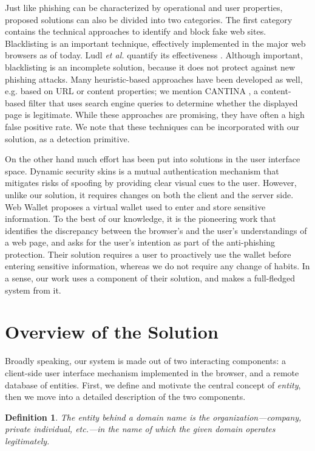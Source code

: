 \documentclass[11pt,styles/chicago,a4paper]{article}
\begin{document}
Just like phishing can be characterized by operational and user properties, proposed solutions can also be divided into two categories. The first category contains the technical approaches to identify and block fake web sites. Blacklisting is an important technique, effectively implemented in the major web browsers as of today. Ludl \emph{et al.} quantify its effectiveness \cite{ludl2007effectiveness}. Although important, blacklisting is an incomplete solution, because it does not protect against new phishing attacks.  Many heuristic-based approaches have been developed as well, e.g. based on URL or content properties; we mention CANTINA \cite{zhang2007cantina}, a content-based filter that uses search engine queries to determine whether the displayed page is legitimate. While these approaches are promising, they have often a high false positive rate. We note that these techniques can be incorporated with our solution, as a detection primitive.

On the other hand much effort has been put into solutions in the user interface space. Dynamic security skins \cite{dhamija2005battle} is a mutual authentication mechanism that mitigates risks of spoofing by providing clear visual cues to the user. However, unlike our solution, it requires changes on both the client and the server side. Web Wallet \cite{wu2006web} proposes a virtual wallet used to enter and store sensitive information. To the best of our knowledge, it is the pioneering work that identifies the discrepancy between the browser's and the user's understandings of a web page, and asks for the user's intention as part of the anti-phishing protection. Their solution requires a user to proactively use the wallet before entering sensitive information, whereas we do not require any change of habits. In a sense, our work uses a component of their solution, and makes a full-fledged system from it.

\section{Overview of the Solution} %

Broadly speaking, our system is made out of two interacting components: a client-side user interface mechanism implemented in the browser, and a remote database of entities. First, we define and motivate the central concept of \emph{entity}, then we move into a detailed description of the two components.

\newtheorem*{def:entity}{Definition}
\begin{def:entity}
The entity behind a domain name is the organization---company, private individual, etc.---in the name of which the given domain operates legitimately.
\end{def:entity}
\end{document}
